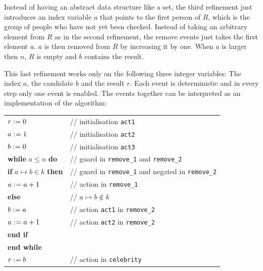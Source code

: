 
Instead of having an abstract data structure like a set, the third refinement just introduces
  an index variable $a$ that points to the first person of $R$, which is the group of people who have not yet been checked.
Instead of taking an arbitrary element from $R$ as in the second refinement, the remove
  events just takes the first element $a$. $a$ is then removed from $R$ by increasing
  it by one.
When $a$ is larger then $n$, $R$ is empty and $b$ contains the result.

This last refinement works only on the following three integer variables: 
The index $a$, the candidate $b$ and the result $r$.
Each event is deterministic and in every step only one event is enabled.
The events together can be interpreted as an implementation of the algorithm:
\newline

\begin{tabular}{ll}
  $r \mathrel{:\mkern1mu=} 0$ & // initialisation \texttt{act1} \\
  $a \mathrel{:\mkern1mu=} 1$ & // initialisation \texttt{act2} \\
  $b \mathrel{:\mkern1mu=} 0$ & // initialisation \texttt{act3} \\
  \textbf{while} $a\leq n$ \textbf{do} & // guard in \texttt{remove\_1} and \texttt{remove\_2}\\
  \quad \textbf{if} $a\mapsto b\in k$ \textbf{then} & // guard in \texttt{remove\_1} and negated in \texttt{remove\_2}\\
  \qquad $a \mathrel{:\mkern1mu=} a+1$ & // action in \texttt{remove\_1} \\
  \quad \textbf{else} & // $a\mapsto b\not\in k$\\
  \qquad $b \mathrel{:\mkern1mu=} a$ & // action \texttt{act1} in \texttt{remove\_2} \\
  \qquad $a \mathrel{:\mkern1mu=} a+1$ & // action \texttt{act2} in \texttt{remove\_2} \\
  \quad \textbf{end if} \\
  \textbf{end while} \\
  $r \mathrel{:\mkern1mu=} b$ & // action in \texttt{celebrity}
\end{tabular}

